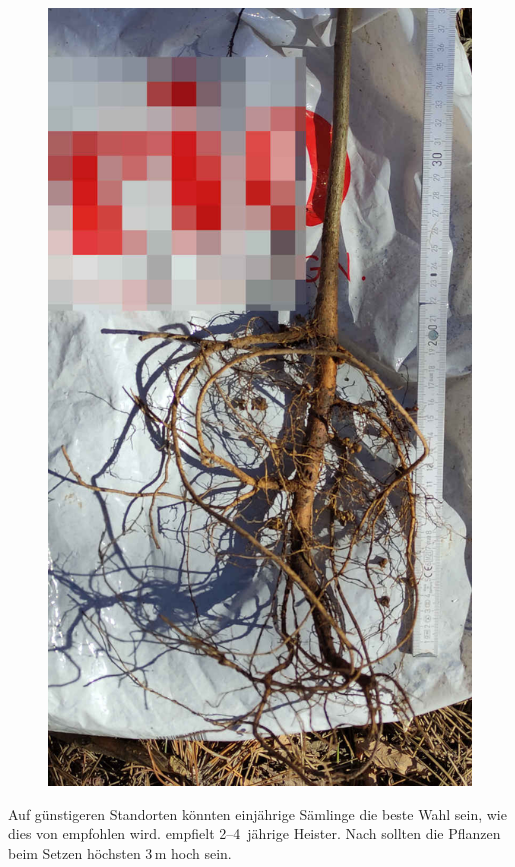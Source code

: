 \documentclass[twocolumn]{scrartcl}
\begin{document}
\begin{figure}[htbp]
  \centering
  \includegraphics[width=.9\linewidth]{./bild/wurzelRobinie}
  \label{fig:wurzelRobinie}
\end{figure}

Auf günstigeren Standorten könnten einjährige Sämlinge die beste Wahl
sein, wie dies von \citet{ciuvat2022robinieRumaenien} empfohlen wird.
\citet[S.~51]{fekete1931robinieErtragstafel} empfielt 2--4~jährige
Heister. Nach \citet{fuehrer2005robinie} sollten die Pflanzen beim
Setzen höchsten 3\,m hoch sein.
\end{document}
